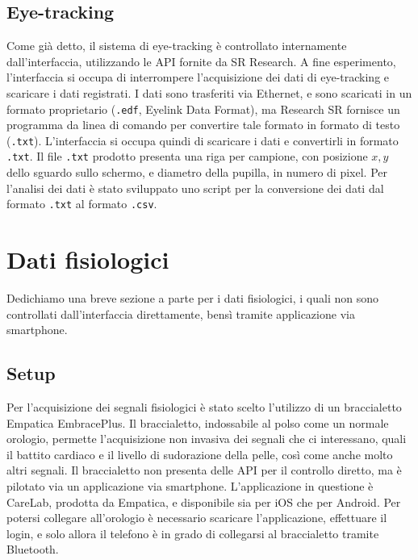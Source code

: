 \subsection{Eye-tracking}

Come già detto, il sistema di eye-tracking è controllato internamente dall'interfaccia, utilizzando le API fornite da SR Research. A fine esperimento, l'interfaccia si occupa di interrompere l'acquisizione dei dati di eye-tracking e scaricare i dati registrati. I dati sono trasferiti via Ethernet, e sono scaricati in un formato proprietario (\verb|.edf|, Eyelink Data Format), ma Research SR fornisce un programma da linea di comando per convertire tale formato in formato di testo (\verb|.txt|). L'interfaccia si occupa quindi di scaricare i dati e convertirli in formato \verb|.txt|. Il file \verb|.txt| prodotto presenta una riga per campione, con posizione $x,y$ dello sguardo sullo schermo, e diametro della pupilla, in numero di pixel. Per l'analisi dei dati è stato sviluppato uno script per la conversione dei dati dal formato \verb|.txt| al formato \verb|.csv|.

\section{Dati fisiologici}
\label{sec:empatica}

Dedichiamo una breve sezione a parte per i dati fisiologici, i quali non sono controllati dall'interfaccia direttamente, bensì tramite applicazione via smartphone. 

\subsection{Setup}

Per l'acquisizione dei segnali fisiologici è stato scelto l'utilizzo di un braccialetto Empatica EmbracePlus. Il braccialetto, indossabile al polso come un normale orologio, permette l'acquisizione non invasiva dei segnali che ci interessano, quali il battito cardiaco e il livello di sudorazione della pelle, così come anche molto altri segnali. Il braccialetto non presenta delle API per il controllo diretto, ma è pilotato via un applicazione via smartphone. L'applicazione in questione è CareLab, prodotta da Empatica, e disponibile sia per iOS che per Android. Per potersi collegare all'orologio è necessario scaricare l'applicazione, effettuare il login, e solo allora il telefono è in grado di collegarsi al braccialetto tramite Bluetooth.


